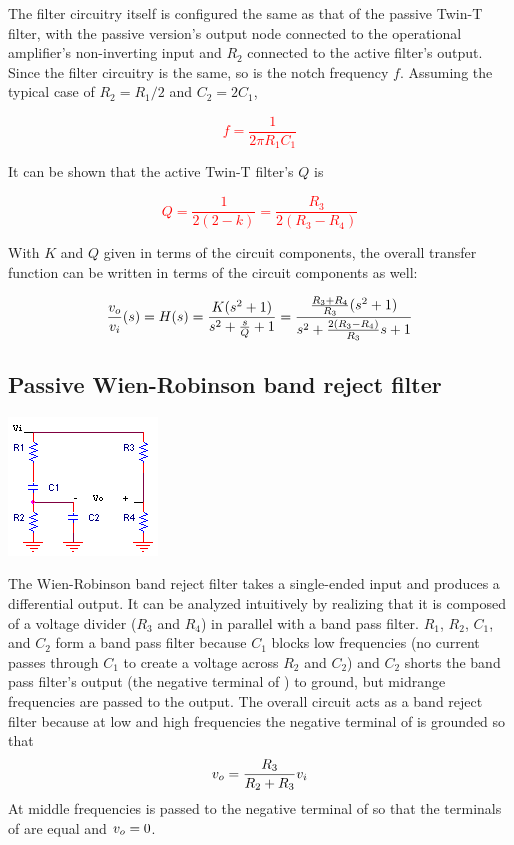 The filter circuitry itself is configured the same as that of the passive Twin-T filter, with the passive version's output node connected to the operational amplifier's non-inverting input and $R_2$ connected to the active filter's output.
Since the filter circuitry is the same, so is the notch frequency $f$.
Assuming the typical case of $R_2 = R_1/2$ and $C_2 = 2C_1$,

\textcolor{red}{
\begin{equation}
f = \frac{1}{2\pi R_1 C_1}
\end{equation}
}

It can be shown \autocite[322]{op-amps-for-everyone} that the active Twin-T filter's $Q$ is

\textcolor{red}{
\begin{equation}
Q = \frac{1}{2(2-k)} = \frac{R_3}{2(R_3 - R_4)}
\end{equation}
}

With $K$ and $Q$ given in terms of the circuit components, the overall transfer function can be written in terms of the circuit components as well:

\textcolor{red}{
\begin{equation}
\frac{\vout}{\vin}(s) = \Hs = \frac{K(s^2 + 1)}{s^2 + \frac{s}{Q} + 1} = \frac{\frac{R_3 + R_4}{R_3}(s^2 + 1)}{s^2 + \frac{2(R_3 - R_4)}{R_3}s+1}
\end{equation}
}

\subsection{Passive Wien-Robinson band reject filter}
\begin{center}
	\includegraphics{schematics/passiveWien-Robinsonbandrejectfilter.PNG}
\end{center}
The Wien-Robinson band reject filter takes a single-ended input and produces a differential output.
It can be analyzed intuitively by realizing that it is composed of a voltage divider ($R_3$ and $R_4$) in parallel with a band pass filter.
$R_1$, $R_2$, $C_1$, and $C_2$ form a band pass filter because $C_1$ blocks low frequencies (no current passes through $C_1$ to create a voltage across $R_2$ and $C_2$) and $C_2$ shorts the band pass filter's output (the negative terminal of \vout) to ground, but midrange frequencies are passed to the output.
The overall circuit acts as a band reject filter because at low and high frequencies the negative terminal of \vout is grounded so that \[\vout = \frac{R_3}{R_2 + R_3}\vin\]
At middle frequencies \vin is passed to the negative terminal of \vout so that the terminals of \vout are equal and $\vout = 0$.

